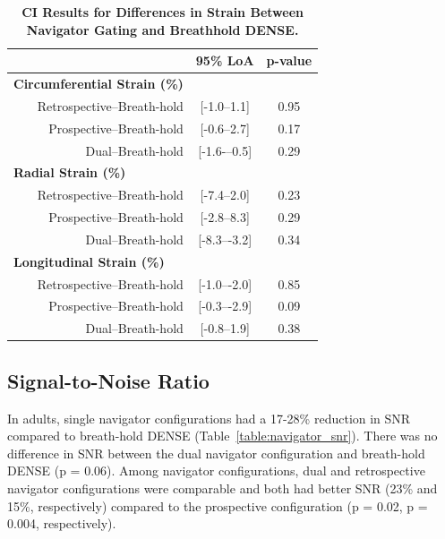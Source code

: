 	\begin{table}
	\centering
	\caption[CI Results for Differences in Strain Between Navigator Gating and Breathhold DENSE]{\textbf{CI Results for Differences in Strain Between Navigator Gating and Breathhold DENSE.}}
	\label{table:nav_CI_strains}
	\begin{tabular}{c c c}
		\toprule
		\multicolumn{1}{c}{}&\multicolumn{1}{c}{\textbf{95\% LoA}} & \multicolumn{1}{c}{\textbf{p-value}}\\ \midrule
		\multicolumn{1}{l}{\textbf{Circumferential Strain (\%)}}   & \multicolumn{2}{c}{}     \\
		\multicolumn{1}{r}{Retrospective--Breath-hold}  & \multicolumn{1}{c}{[-1.0--1.1]}  & \multicolumn{1}{c}{0.95} \\
		\multicolumn{1}{r}{Prospective--Breath-hold}    & \multicolumn{1}{c}{[-0.6--2.7]}  & \multicolumn{1}{c}{0.17} \\
		\multicolumn{1}{r}{Dual--Breath-hold}           & \multicolumn{1}{c}{[-1.6-–0.5]}  & \multicolumn{1}{c}{0.29} \\
		\multicolumn{1}{l}{\textbf{Radial Strain (\%)}}            & \multicolumn{2}{c}{}     \\
		\multicolumn{1}{r}{Retrospective--Breath-hold}  & \multicolumn{1}{c}{[-7.4--2.0]}  & \multicolumn{1}{c}{0.23} \\
		\multicolumn{1}{r}{Prospective--Breath-hold}    & \multicolumn{1}{c}{[-2.8--8.3]}  & \multicolumn{1}{c}{0.29} \\
		\multicolumn{1}{r}{Dual--Breath-hold}           & \multicolumn{1}{c}{[-8.3–-3.2]}  & \multicolumn{1}{c}{0.34} \\
		\multicolumn{1}{l}{\textbf{Longitudinal Strain (\%)}}      & \multicolumn{2}{c}{}     \\
		\multicolumn{1}{r}{Retrospective--Breath-hold}  & \multicolumn{1}{c}{[-1.0–-2.0]}   & \multicolumn{1}{c}{0.85} \\
		\multicolumn{1}{r}{Prospective--Breath-hold}    & \multicolumn{1}{c}{[-0.3–-2.9]}   & \multicolumn{1}{c}{0.09} \\
		\multicolumn{1}{r}{Dual--Breath-hold}           & \multicolumn{1}{c}{[-0.8--1.9]}   & \multicolumn{1}{c}{0.38} \\
		\bottomrule                                 
	\end{tabular}
\end{table}



\subsection{Signal-to-Noise Ratio}
	In adults, single navigator configurations had a 17-28\% reduction in SNR compared to breath-hold DENSE (Table~\ref{table:navigator_snr}). There was no difference in SNR between the dual navigator configuration and breath-hold DENSE (p = 0.06). Among navigator configurations, dual and retrospective navigator configurations were comparable and both had better SNR (23\% and 15\%, respectively) compared to the prospective configuration (p = 0.02, p = 0.004, respectively).
	
